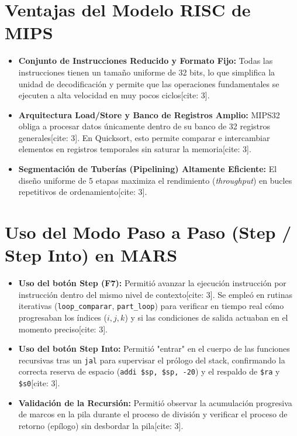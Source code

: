 \documentclass[12pt,a4paper]{article}
\begin{document}
\section{Ventajas del Modelo RISC de MIPS}

\begin{itemize}
    \item \textbf{Conjunto de Instrucciones Reducido y Formato Fijo:} Todas las instrucciones tienen un tamaño uniforme de 32 bits, lo que simplifica la unidad de decodificación y permite que las operaciones fundamentales se ejecuten a alta velocidad en muy pocos ciclos[cite: 3].
    \item \textbf{Arquitectura Load/Store y Banco de Registros Amplio:} MIPS32 obliga a procesar datos únicamente dentro de su banco de 32 registros generales[cite: 3]. En Quicksort, esto permite comparar e intercambiar elementos en registros temporales sin saturar la memoria[cite: 3].
    \item \textbf{Segmentación de Tuberías (Pipelining) Altamente Eficiente:} El diseño uniforme de 5 etapas maximiza el rendimiento (\textit{throughput}) en bucles repetitivos de ordenamiento[cite: 3].
\end{itemize}


\section{Uso del Modo Paso a Paso (Step / Step Into) en MARS}

\begin{itemize}
    \item \textbf{Uso del botón Step (F7):} Permitió avanzar la ejecución instrucción por instrucción dentro del mismo nivel de contexto[cite: 3]. Se empleó en rutinas iterativas (\texttt{loop\_comparar}, \texttt{part\_loop}) para verificar en tiempo real cómo progresaban los índices ($i, j, k$) y si las condiciones de salida actuaban en el momento preciso[cite: 3].
    \item \textbf{Uso del botón Step Into:} Permitió "entrar" en el cuerpo de las funciones recursivas tras un \texttt{jal} para supervisar el prólogo del stack, confirmando la correcta reserva de espacio (\texttt{addi \$sp, \$sp, -20}) y el respaldo de \texttt{\$ra} y \texttt{\$s0}[cite: 3].
    \item \textbf{Validación de la Recursión:} Permitió observar la acumulación progresiva de marcos en la pila durante el proceso de división y verificar el proceso de retorno (epílogo) sin desbordar la pila[cite: 3].
\end{itemize}
\end{document}

